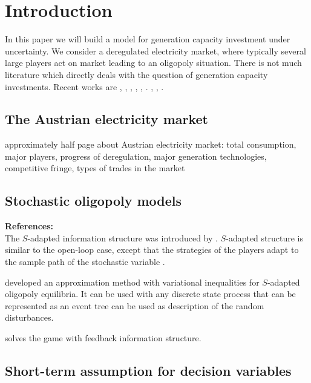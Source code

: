 \section{Introduction}

In this paper we will build a model for generation capacity investment under uncertainty. We consider a deregulated electricity market, where typically several large players act on market leading to an oligopoly situation. There is not much literature which directly deals with the question of  generation capacity investments. Recent works are \cite{Chuang2001}, \cite{Ventosa2002}, \cite{Chaton2003}, \cite{Hogendorn2003}, \cite{Pineau2003}, \cite{Ehrenmann2004}. \cite{Murphy2005}, \cite{Kiesling2007}, \cite{Pineau2007}.

\subsection{The Austrian electricity market}

approximately half page about Austrian electricity market: total consumption, major players, progress of deregulation, major generation technologies, competitive fringe, types of trades in the market


\subsection{Stochastic oligopoly models}

\textbf{References:} \cite{Salant1982, Wolf1997, Haurie2002, Pineau2003, Murto2004}\\


The $S$-adapted information structure was introduced by \cite{Haurie1990}.
$S$-adapted structure is similar to the open-loop case, except that the strategies of the players adapt to the sample path of the stochastic variable \citep[see][pg. 128]{Pineau2003}.

\cite{Haurie2002} developed an approximation method with variational inequalities for $S$-adapted oligopoly equilibria. It can be used with any discrete state process that can be represented as an event tree can be used as description of the random disturbances.

\cite{Murto2004} solves the game with feedback information structure.

\subsection{Short-term assumption for decision variables}

